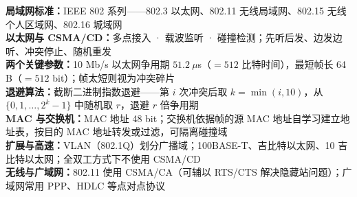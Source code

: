 \documentclass[a4paper,11pt]{article}
\begin{document}

\begin{knowmap}
\textbf{局域网标准：}IEEE 802 系列——802.3 以太网、802.11 无线局域网、802.15 无线个人区域网、802.16 城域网\\[2pt]
\textbf{以太网与 CSMA/CD：}多点接入 · 载波监听 · 碰撞检测；先听后发、边发边听、冲突停止、随机重发\\[2pt]
\textbf{两个关键参数：}10 Mb/s 以太网争用期 $51.2\ \mu$s（$=512$ 比特时间），最短帧长 64 B（$=512$ bit）；帧太短则视为冲突碎片\\[2pt]
\textbf{退避算法：}截断二进制指数退避——第 $i$ 次冲突后取 $k=\min(i,10)$，从 $\{0,1,\dots,2^k-1\}$ 中随机取 $r$，退避 $r$ 倍争用期\\[2pt]
\textbf{MAC 与交换机：}MAC 地址 48 bit；交换机依据帧的源 MAC 地址自学习建立地址表，按目的 MAC 地址转发或过滤，可隔离碰撞域\\[2pt]
\textbf{扩展与高速：}VLAN（802.1Q）划分广播域；100BASE-T、吉比特以太网、10 吉比特以太网；全双工方式下不使用 CSMA/CD\\[2pt]
\textbf{无线与广域网：}802.11 使用 CSMA/CA（可辅以 RTS/CTS 解决隐藏站问题）；广域网常用 PPP、HDLC 等点对点协议
\end{knowmap}
\end{document}

